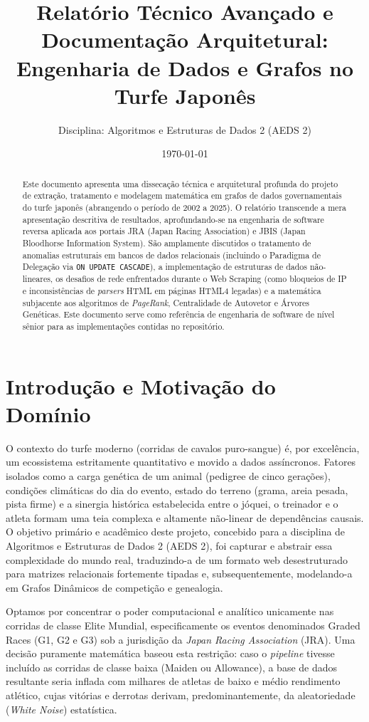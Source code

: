 \documentclass[12pt,a4paper]{article}
\title{\textbf{Relatório Técnico Avançado e Documentação Arquitetural:\\Engenharia de Dados e Grafos no Turfe Japonês}}
\author{Disciplina: Algoritmos e Estruturas de Dados 2 (AEDS 2)}
\date{\today}
\begin{document}
\maketitle
\tableofcontents
\newpage

\begin{abstract}
Este documento apresenta uma dissecação técnica e arquitetural profunda do projeto de extração, tratamento e modelagem matemática em grafos de dados governamentais do turfe japonês (abrangendo o período de 2002 a 2025). O relatório transcende a mera apresentação descritiva de resultados, aprofundando-se na engenharia de software reversa aplicada aos portais JRA (Japan Racing Association) e JBIS (Japan Bloodhorse Information System). São amplamente discutidos o tratamento de anomalias estruturais em bancos de dados relacionais (incluindo o Paradigma de Delegação via \texttt{ON UPDATE CASCADE}), a implementação de estruturas de dados não-lineares, os desafios de rede enfrentados durante o Web Scraping (como bloqueios de IP e inconsistências de \textit{parsers} HTML em páginas HTML4 legadas) e a matemática subjacente aos algoritmos de \textit{PageRank}, Centralidade de Autovetor e Árvores Genéticas. Este documento serve como referência de engenharia de software de nível sênior para as implementações contidas no repositório.
\end{abstract}

\section{Introdução e Motivação do Domínio}
O contexto do turfe moderno (corridas de cavalos puro-sangue) é, por excelência, um ecossistema estritamente quantitativo e movido a dados assíncronos. Fatores isolados como a carga genética de um animal (pedigree de cinco gerações), condições climáticas do dia do evento, estado do terreno (grama, areia pesada, pista firme) e a sinergia histórica estabelecida entre o jóquei, o treinador e o atleta formam uma teia complexa e altamente não-linear de dependências causais. O objetivo primário e acadêmico deste projeto, concebido para a disciplina de Algoritmos e Estruturas de Dados 2 (AEDS 2), foi capturar e abstrair essa complexidade do mundo real, traduzindo-a de um formato web desestruturado para matrizes relacionais fortemente tipadas e, subsequentemente, modelando-a em Grafos Dinâmicos de competição e genealogia.

Optamos por concentrar o poder computacional e analítico unicamente nas corridas de classe Elite Mundial, especificamente os eventos denominados Graded Races (G1, G2 e G3) sob a jurisdição da \textit{Japan Racing Association} (JRA). Uma decisão puramente matemática baseou esta restrição: caso o \textit{pipeline} tivesse incluído as corridas de classe baixa (Maiden ou Allowance), a base de dados resultante seria inflada com milhares de atletas de baixo e médio rendimento atlético, cujas vitórias e derrotas derivam, predominantemente, da aleatoriedade (\textit{White Noise}) estatística.
\end{document}
